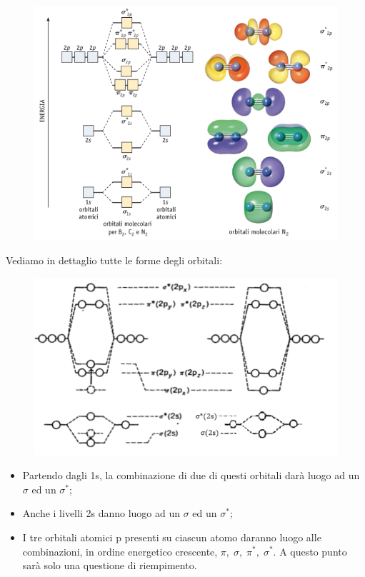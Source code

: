 \begin{figure}[htp]
    \centering
    \includegraphics[width=14cm]{immagini/livelli_B2_C2_N2.png}
\end{figure}
\newpage
Vediamo in dettaglio tutte le forme degli orbitali:

\begin{figure}[htp]
    \centering
    \includegraphics[width=14cm]{immagini/sequenza_energetica_BCN.png}
\end{figure}

\begin{itemize}
    \item Partendo dagli 1s, la combinazione di due di questi orbitali darà luogo ad un $\sigma$ ed un $\sigma^*$;
    \item Anche i livelli 2s danno luogo ad un $\sigma$ ed un $\sigma^*$;
    \item I tre orbitali atomici p presenti su ciascun atomo daranno luogo alle combinazioni, in ordine energetico crescente, $\pi,\; \sigma, \; \pi^*, \; \sigma^*$. A questo punto sarà solo una questione di riempimento.
\end{itemize}

